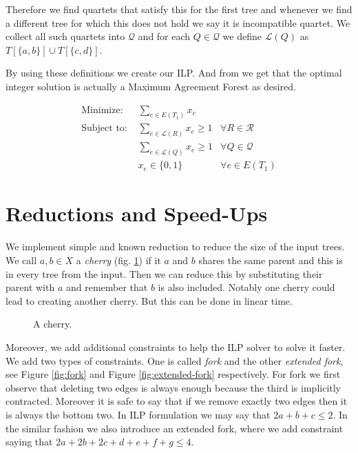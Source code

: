 \documentclass{article}
\theoremstyle{plain}
\theoremstyle{definition}
\newcommand{\trios}{\mathcal{R}}
\newcommand{\quartets}{\mathcal{Q}}
\begin{document}
  Therefore we find quartets that satisfy this for the first tree and whenever we find a different tree
  for which this does not hold we say it is incompatible quartet.
  We collect all such quartets into $\quartets$ and for each $Q \in \quartets$ we
  define $\mathcal{L}(Q)$ as $T[\{a,b\}] \cup T[\{c,d\}]$.

  By using these definitions we create our ILP. And from \cite{wuPracticalMethodExact2009} we get
  that the optimal integer solution is actually a Maximum Agreement Forest as desired.

  \begin{align*}
    \text{Minimize: } & \sum_{e \in E(T_1)} x_e \\
    \text{Subject to: } & \sum_{e \in \mathcal{L}(R)} x_e \geq 1 & \forall R \in \trios \\
                & \sum_{e \in \mathcal{L}(Q)} x_e \geq 1 & \forall Q \in \quartets \\
            & x_e \in \{0, 1\} & \forall e \in E(T_1)
  \end{align*}

  \section{Reductions and Speed-Ups}

  We implement simple and known reduction to reduce the size of the input trees.
  We call $a,b \in X$ a \emph{cherry} (fig. \ref{fig:cherry}) if
  it $a$ and $b$ shares the same parent and this is in every tree from the input. Then we can reduce this
  by substituting their parent with $a$ and remember that $b$ is also included. Notably one
  cherry could lead to creating another cherry. But this can be done in linear time.

  \begin{figure}[!ht]\centering
      \caption{A cherry.}\label{fig:cherry}
  \end{figure}

  Moreover, we add additional constraints to help the ILP solver to solve it faster. We add two types of
  constraints. One is called \emph{fork} and the other \emph{extended fork}, see Figure \ref{fig:fork} and Figure \ref{fig:extended-fork}
  respectively. For fork we first observe that deleting two edges is always enough because the third is implicitly contracted.
  Moreover it is safe to say that if we remove exactly two edges then it is always the bottom two. In ILP formulation we may say
  that $2a + b + c \leq 2$. In the similar fashion we also introduce an extended fork, where we add constraint saying that
  $2a + 2b + 2c + d + e + f + g \leq 4$.
\end{document}
